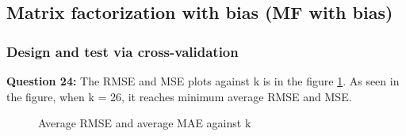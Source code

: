 \documentclass{article}
\begin{document}
\begin{table}[h]
\center
\caption{Top 10 movie for column 5}
\label{tab:Q22c5}
\end{table}




\subsection{Matrix factorization with bias (MF with bias)}

\subsubsection{Design and test via cross-validation}

\bigbreak \textbf{Question 24:}
The RMSE and MSE plots against k is in the figure \ref{Q24}. As seen in the figure, when k = 26, it reaches minimum average RMSE and MSE.

\begin{figure}
\centering
{}
\caption{Average RMSE and average MAE against k} \label{Q24}
\end{figure}
\end{document}

